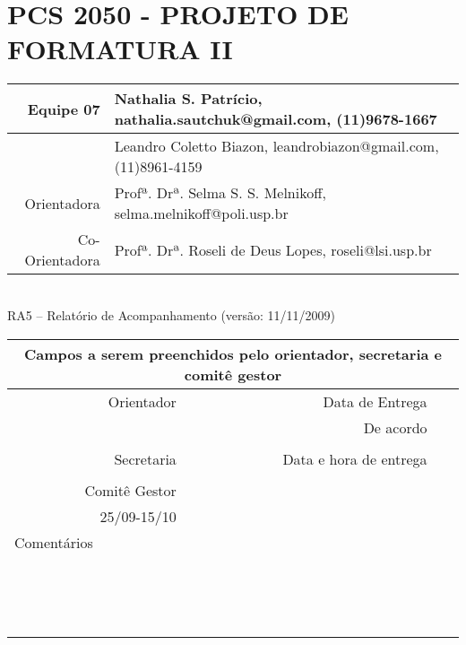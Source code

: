 \documentclass[a4paper,12pt,font=plain,header=plain]{abnt}
\begin{document}
  \capa

	\renewenvironment{center}{}{}
	\section*{PCS 2050 - PROJETO DE FORMATURA II}
	
	\begin{tabular}[|l|]{ |r|l| }
	\hline
				Equipe 07 & Nathalia S. Patrício, nathalia.sautchuk@gmail.com, (11)9678-1667 \\
			\hline
				& Leandro Coletto Biazon, leandrobiazon@gmail.com, (11)8961-4159 \\
			\hline
					Orientadora & Profª. Drª. Selma S. S. Melnikoff, selma.melnikoff@poli.usp.br \\
			\hline
				Co-Orientadora & Profª. Drª. Roseli de Deus Lopes, roseli@lsi.usp.br \\
			\hline
			\end{tabular} \\
	
			RA5 – Relatório de Acompanhamento (versão: 11/11/2009) \\
	
			\begin{tabular}{ |r|r|r| }
	
			\hline
				\multicolumn{3}{|c|}{Campos a serem preenchidos pelo orientador, secretaria e comitê gestor} \\
			\hline
				Orientador & Data de Entrega &  \\
			\hline
				& De acordo &  \\
			\hline
				& &  \\
			\hline
				Secretaria & Data e hora de entrega &  \\
			\hline
				&  &  \\
			\hline
				Comitê Gestor &  &  \\
			\hline25/09-15/10
			&  &  \\
			\hline
				\multicolumn{3}{|l|}{Comentários} \\
				\multicolumn{3}{|l|}{} \\
				\multicolumn{3}{|l|}{} \\
				\multicolumn{3}{|l|}{} \\
				\multicolumn{3}{|l|}{} \\
				\multicolumn{3}{|l|}{} \\
				\multicolumn{3}{|l|}{} \\
				\multicolumn{3}{|l|}{} \\
				\multicolumn{3}{|l|}{} \\
				\multicolumn{3}{|l|}{} \\
				\multicolumn{3}{|l|}{} \\
				\multicolumn{3}{|l|}{} \\
				\multicolumn{3}{|l|}{} \\
				\multicolumn{3}{|l|}{} \\
				\multicolumn{3}{|l|}{} \\
				\multicolumn{3}{|l|}{} \\
			\hline
			\end{tabular}
\end{document}
